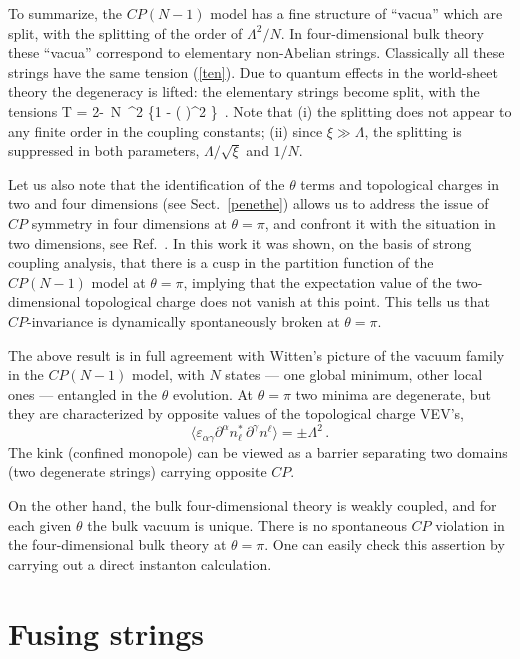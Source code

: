 To summarize, the  $CP(N-1)$ 
model has a fine structure of ``vacua'' which are split,
with the splitting of the order of $\Lambda^2/N$. In 
four-dimensional bulk
theory these ``vacua'' correspond to elementary non-Abelian strings.
Classically all these strings have the same tension (\ref{ten}). Due to
quantum effects in the world-sheet theory 
the degeneracy is lifted:
the elementary strings become split, with the tensions
\beq
T  = 2\pi\xi -\, N\, \Lambda^2
\left\{1 - \left(
\right)^2
\right\}
\,.
\label{splitten}
\eeq
Note that (i) the splitting does not appear to any finite order
in the   coupling constants; (ii) since
$\xi\gg \Lambda$,  the splitting is suppressed in both parameters, 
$\Lambda/\sqrt{\xi}$ and $1/N$.

Let us also note that the identification  of the $\theta$ terms
and topological charges in two and four
dimensions (see Sect.~\ref{penethe}) allows us to address the issue of 
$CP$ symmetry in four
dimensions at $\theta=\pi$, and confront it with
the situation  in two dimensions, see Ref.~\cite{Seiberg}.
In this work it was shown, on the basis of
strong coupling analysis, that
there is a cusp in the partition function of the $CP(N-1)$ model
at $\theta=\pi$, implying that the
expectation value of the two-dimensional
topological charge does not vanish at this point. This tells us
that $CP$-invariance is dynamically
spontaneously broken at $\theta=\pi$.

The above result is in full agreement with Witten's picture
of the vacuum family in the $CP(N-1)$ model,
with $N$ states --- one global minimum, other local ones ---
entangled in the $\theta$ evolution. At $\theta =\pi$
two minima are degenerate, but they are characterized by opposite values of
the topological charge VEV's,
$$
\langle \varepsilon_{\alpha\gamma} \partial^\alpha  
n_{\ell}^*\, \partial^\gamma n^{\ell}\rangle
= \pm
\Lambda^2\,.
$$
The kink (confined monopole) can be viewed as 
a barrier separating two domains (two degenerate strings)
carrying opposite $CP$.

On the other hand, the bulk four-dimensional theory is weakly coupled,
and for each given $\theta$ the bulk vacuum is unique.
There is no spontaneous
$CP$ violation  in the four-dimensional bulk theory at $\theta=\pi$.
One can easily check this assertion by carrying out a direct instanton calculation.

\section{Fusing strings}

